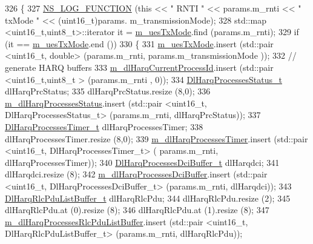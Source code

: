 \begin{DoxyCode}
326 \{
327   \hyperlink{log-macros-disabled_8h_a90b90d5bad1f39cb1b64923ea94c0761}{NS\_LOG\_FUNCTION} (\textcolor{keyword}{this} << \textcolor{stringliteral}{" RNTI "} << params.m\_rnti << \textcolor{stringliteral}{" txMode "} << (uint16\_t)params.
      m\_transmissionMode);
328   std::map <uint16\_t,uint8\_t>::iterator it = \hyperlink{classns3_1_1FdBetFfMacScheduler_a1a3c593a10fbac9008cb1b991746dda2}{m\_uesTxMode}.find (params.m\_rnti);
329   \textcolor{keywordflow}{if} (it == \hyperlink{classns3_1_1FdBetFfMacScheduler_a1a3c593a10fbac9008cb1b991746dda2}{m\_uesTxMode}.end ())
330     \{
331       \hyperlink{classns3_1_1FdBetFfMacScheduler_a1a3c593a10fbac9008cb1b991746dda2}{m\_uesTxMode}.insert (std::pair <uint16\_t, double> (params.m\_rnti, params.m\_transmissionMode
      ));
332       \textcolor{comment}{// generate HARQ buffers}
333       \hyperlink{classns3_1_1FdBetFfMacScheduler_a7c1cfb93fd3fa63e6811486c023934c2}{m\_dlHarqCurrentProcessId}.insert (std::pair <uint16\_t,uint8\_t > (params.m\_rnti
      , 0));
334       \hyperlink{namespacens3_a457b3571b67ff17d042e9894e90e2ce2}{DlHarqProcessesStatus\_t} dlHarqPrcStatus;
335       dlHarqPrcStatus.resize (8,0);
336       \hyperlink{classns3_1_1FdBetFfMacScheduler_a93d8bf3298e9b289d9fcf70571b27b78}{m\_dlHarqProcessesStatus}.insert (std::pair <uint16\_t, DlHarqProcessesStatus\_t> 
      (params.m\_rnti, dlHarqPrcStatus));
337       \hyperlink{namespacens3_a39413ade536de4b1c82d6c0074cc703e}{DlHarqProcessesTimer\_t} dlHarqProcessesTimer;
338       dlHarqProcessesTimer.resize (8,0);
339       \hyperlink{classns3_1_1FdBetFfMacScheduler_a78314b001be9986429ecb13daac0885a}{m\_dlHarqProcessesTimer}.insert (std::pair <uint16\_t, DlHarqProcessesTimer\_t> (
      params.m\_rnti, dlHarqProcessesTimer));
340       \hyperlink{namespacens3_af25599bf8f9f564075c005759c9af18c}{DlHarqProcessesDciBuffer\_t} dlHarqdci;
341       dlHarqdci.resize (8);
342       \hyperlink{classns3_1_1FdBetFfMacScheduler_af37ecddc35da4f5a44cc0c50b08a4a96}{m\_dlHarqProcessesDciBuffer}.insert (std::pair <uint16\_t,
       DlHarqProcessesDciBuffer\_t> (params.m\_rnti, dlHarqdci));
343       \hyperlink{namespacens3_a4c0cbd1e72f1c667f8b5879655f13210}{DlHarqRlcPduListBuffer\_t} dlHarqRlcPdu;
344       dlHarqRlcPdu.resize (2);
345       dlHarqRlcPdu.at (0).resize (8);
346       dlHarqRlcPdu.at (1).resize (8);
347       \hyperlink{classns3_1_1FdBetFfMacScheduler_ace3cb887417444023ca2f39d5de6a7cf}{m\_dlHarqProcessesRlcPduListBuffer}.insert (std::pair <uint16\_t,
       DlHarqRlcPduListBuffer\_t> (params.m\_rnti, dlHarqRlcPdu));

\end{DoxyCode}
